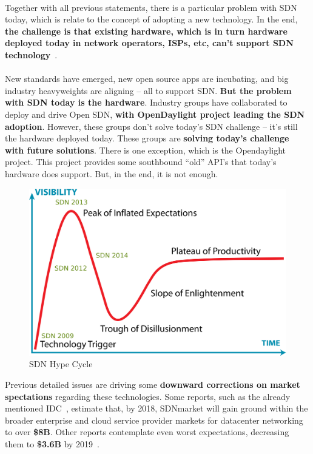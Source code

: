 \documentclass[a4paper, 12pt]{book}
\begin{document}
\\
Together with all previous statements, there is a particular problem with SDN today, which is relate to the concept of adopting a new technology. In the end, \textbf{the challenge is that existing hardware, which is in turn hardware deployed today in network operators, ISPs, etc, can’t support SDN technology}~\cite{TagArchivesSDN}.\\
\\
New standards have emerged, new open source apps are incubating, and big industry heavyweights are aligning – all to support SDN. \textbf{But the problem with SDN today is the hardware}. Industry groups have collaborated to deploy and drive Open SDN, \textbf{with OpenDaylight project leading the SDN adoption}. However, these groups don’t solve today’s SDN challenge – it’s still the hardware deployed today. These groups are \textbf{solving today’s challenge with future solutions}. There is one exception, which is the Opendaylight project. This project provides some southbound “old” API’s that today’s hardware does support. But, in the end, it is not enough.
\begin{center}
 \begin{figure}[H]
 \begin{center}
   \includegraphics[width=15cm]{img/hype-cycle-03.png}
   \caption{SDN Hype Cycle}
   \label{fig:sdn_hype_cyle}
 \end{center}
 \end{figure}
\end{center}
Previous detailed issues are driving some \textbf{downward corrections on market spectations} regarding these technologies. Some reports, such as the already mentioned IDC~\cite{SDNMarket20142018IDC}, estimate that, by 2018, SDNmarket will gain ground within the broader enterprise and cloud service provider markets for datacenter networking to over \textbf{\$8B}. Other reports contemplate even worst expectations, decreasing them to \textbf{\$3.6B} by 2019~\cite{SDNMarket20142018PRNewsWire}.
\end{document}
